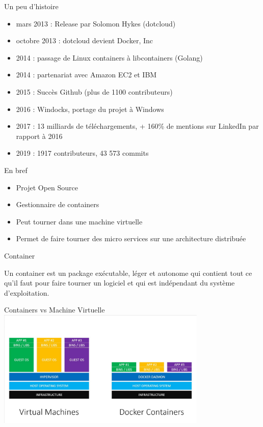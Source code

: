 \begin{frame}{Un peu d'histoire}
    \begin{itemize}
        \item mars 2013 : Release par Solomon Hykes (dotcloud)
        \item octobre 2013 : dotcloud devient Docker, Inc
        \item 2014 : passage de Linux containers à libcontainers (Golang)
        \item 2014 : partenariat avec Amazon EC2 et IBM
        \item 2015 : Succès Github (plus de 1100 contributeurs)
        \item 2016 : Windocks, portage du projet à Windows 
        \item 2017 : 13 milliards de téléchargements, + 160\% de mentions sur LinkedIn par rapport à 2016
        \item 2019 : 1917 contributeurs, 43 573 commits
    \end{itemize}
\end{frame}

\begin{frame}{En bref}
\begin{itemize}
    \item Projet Open Source
    \item Gestionnaire de containers
    \item Peut tourner dans une machine virtuelle
    \item Permet de faire tourner des micro services sur une architecture distribuée
\end{itemize}
    
\end{frame}

\begin{frame}{Container}

\begin{block}{}
     Un container est un package exécutable, léger et autonome qui contient tout ce qu'il faut pour faire tourner un logiciel et qui est indépendant du système d'exploitation.
\end{block}

\end{frame}

\begin{frame}{Containers vs Machine Virtuelle}
    \includegraphics[width=10cm]{img/dockerVSVM.jpg}
\end{frame}